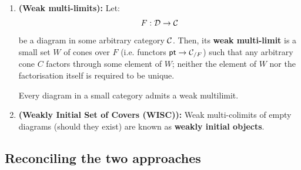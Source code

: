                     \begin{example}
                        
                    \end{example}
                    
                    \begin{definition} \label{def: weak_multilimits}
                        \noindent
                        \begin{enumerate}
                            \item \textbf{(Weak multi-limits):} Let:
                                $$F: \mathcal{D} \to \mathcal{C}$$
                            be a diagram in some arbitrary category $\mathcal{C}$. Then, its \textbf{weak multi-limit} is a small set $W$ of cones over $F$ (i.e. functors $\mathsf{pt} \to \mathcal{C}_{/F}$) such that any arbitrary cone $C$ factors through some element of $W$; neither the element of $W$ nor the factorisation itself is required to be unique. 
                            
                            Every diagram in a small category admits a weak multilimit.
                            \item \textbf{(Weakly Initial Set of Covers (WISC)):} Weak multi-colimits of empty diagrams (should they exist) are known as \textbf{weakly initial objects}.   
                        \end{enumerate}
                    \end{definition}
            
        \subsection{Reconciling the two approaches}
